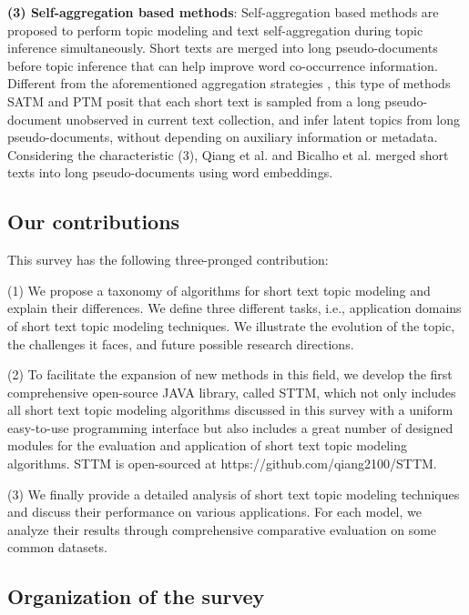 \documentclass[10pt,journal,compsoc]{IEEEtran}
\begin{document}
\textbf{(3) Self-aggregation based methods}: Self-aggregation based methods are proposed to perform topic modeling and text self-aggregation during topic inference simultaneously. Short texts are merged into long pseudo-documents before topic inference that can help improve word co-occurrence information. Different from the aforementioned aggregation strategies \cite{weng2010twitterrank,mehrotra2013improving}, this type of methods SATM \cite{quan2015short} and PTM\cite{zuo2016topic} posit that each short text is sampled from a long pseudo-document unobserved in current text collection, and infer latent topics from long pseudo-documents, without depending on auxiliary information or metadata. Considering the characteristic (3), Qiang et al. \cite{qiang2017topic} and Bicalho et al. \cite{bicalho2017general} merged short texts into long pseudo-documents using word embeddings.



\subsection{Our contributions}

This survey has the following three-pronged contribution:

(1) We propose a taxonomy of algorithms for short text topic modeling and explain their differences. We define three different tasks, i.e., application domains of short text topic modeling techniques. We illustrate the evolution of the topic, the challenges it faces, and future possible research directions.


(2) To facilitate the expansion of new methods in this field, we develop the first comprehensive open-source JAVA library, called STTM, which not only includes all short text topic modeling algorithms discussed in this survey with a uniform easy-to-use programming interface but also includes a great number of designed modules for the evaluation and application of short text topic modeling algorithms. STTM is open-sourced at https://github.com/qiang2100/STTM.

(3) We finally provide a detailed analysis of short text topic modeling techniques and discuss their performance on various applications. For each model, we analyze their results through comprehensive comparative evaluation on some common datasets.


\subsection{Organization of the survey}
\end{document}
